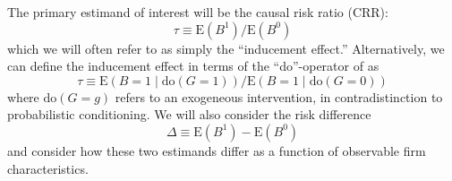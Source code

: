 \documentclass[aoas,preprint, 11pt, dvipsnames, table, x11name]{imsart}
\newcommand{\E}{\mbox{E}}
\theoremstyle{remark}
\begin{document}
	The primary estimand of interest will be the causal risk ratio (CRR):
	\begin{equation}
		\tau \equiv \E(B^1)/\E(B^0)
	\end{equation}
	which we will often refer to as simply the ``inducement effect.'' Alternatively, we can define the inducement effect in terms of the ``do''-operator of \cite{pearl-2000} as 
	\begin{equation}
		\tau \equiv \E(B=1 \mid \text{do}(G=1))/\E(B=1 \mid \text{do}(G=0))
	\end{equation}
	where $\text{do}(G=g)$ refers to an exogeneous intervention, in contradistinction to probabilistic conditioning. We will also consider the risk difference
	\begin{equation}
		\Delta \equiv \E(B^1) - \E(B^0)
	\end{equation}
	and consider how these two estimands differ as a function of observable firm characteristics.
	
\end{document}
